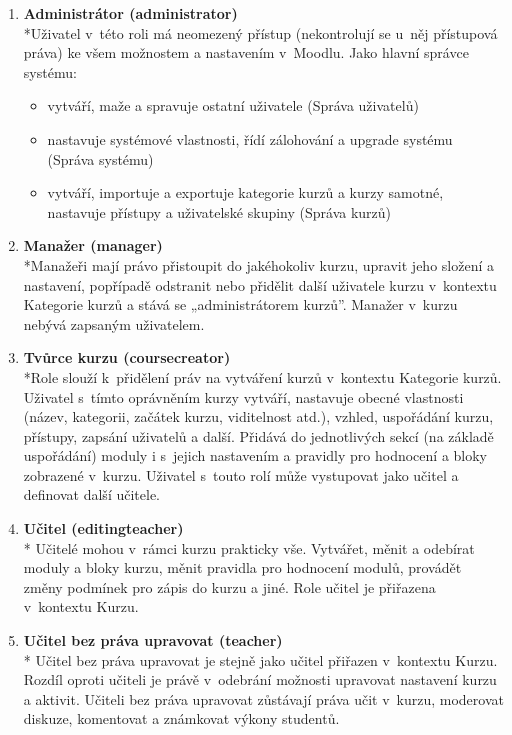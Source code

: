 \documentclass[
print,
  11pt,
  table,   
  nolof,    
  nolot,
  oneside,
  draft
]{fithesis3}
\begin{document}
\begin{enumerate}
\item \textbf{Administrátor (administrator)} \\*Uživatel v~této roli má neomezený přístup (nekontrolují se u~něj přístupová práva) ke všem možnostem a nastavením v~Moodlu. Jako hlavní správce systému: \begin{itemize}
	\item vytváří, maže a spravuje ostatní uživatele (Správa uživatelů)
	\item nastavuje systémové vlastnosti, řídí zálohování a upgrade systému (Správa systému)
	\item vytváří, importuje a exportuje kategorie kurzů a kurzy samotné, nastavuje přístupy a uživatelské skupiny (Správa kurzů)
\end{itemize}
\item \textbf{Manažer (manager)} \\*Manažeři mají právo přistoupit do jakéhokoliv kurzu, upravit jeho složení a nastavení, popřípadě odstranit nebo přidělit další uživatele kurzu v~kontextu Kategorie kurzů a stává se „administrátorem kurzů”. Manažer v~kurzu nebývá zapsaným uživatelem.
 	
\item \textbf{Tvůrce kurzu (coursecreator)} \\*Role slouží k~přidělení práv na vytváření kurzů v~kontextu Kategorie kurzů. Uživatel s~tímto oprávněním kurzy vytváří, nastavuje obecné vlastnosti (název, kategorii, začátek kurzu, viditelnost atd.), vzhled, uspořádání kurzu, přístupy, zapsání uživatelů a další. Přidává do jednotlivých sekcí (na základě uspořádání) moduly i s~jejich nastavením a pravidly pro hodnocení a bloky zobrazené v~kurzu. Uživatel s~touto rolí může vystupovat jako učitel a definovat další učitele.
	
\item \textbf{Učitel (editingteacher)} \\*
	Učitelé mohou v~rámci kurzu prakticky vše. Vytvářet, měnit a odebírat moduly a bloky kurzu, měnit pravidla pro hodnocení modulů, provádět změny podmínek pro zápis do kurzu a jiné. Role učitel je přiřazena v~kontextu Kurzu. 

\item \textbf{Učitel bez práva upravovat (teacher)} \\*
	Učitel bez práva upravovat je stejně jako učitel přiřazen v~kontextu Kurzu. Rozdíl oproti učiteli je právě v~odebrání možnosti upravovat nastavení kurzu a aktivit. Učiteli bez práva upravovat zůstávají práva učit v~kurzu, moderovat diskuze, komentovat a známkovat výkony studentů.


\end{enumerate}
\end{document}
